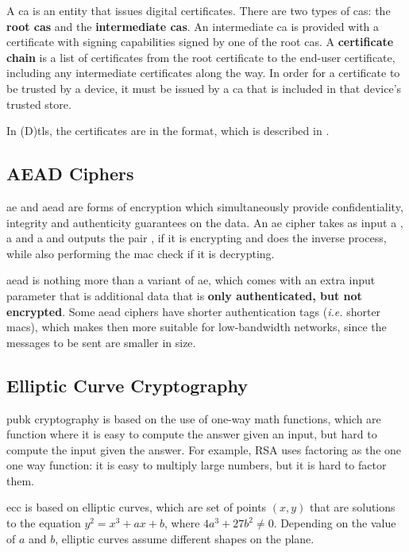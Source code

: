 \documentclass{llncs}
\begin{document}
A \gls{ca} is an entity that issues digital certificates. There are two types of
\gls{ca}s: the \textbf{root \gls{ca}s} and the \textbf{intermediate \gls{ca}s}.
An intermediate \gls{ca} is provided with a certificate with signing capabilities
signed by one of the root \gls{ca}s. A \textbf{certificate chain} is a list of
certificates from the root certificate to the end-user certificate, including
any intermediate certificates along the way. In order for a certificate
to be trusted by a device, it must be issued by a \gls{ca} that is included in that device's trusted store.

In (D)\gls{tls}, the certificates are in the  format, which is
described in \cite{rfc5280}.

\subsection{AEAD Ciphers}

\gls{ae} and \gls{aead} are forms of encryption which simultaneously provide
confidentiality, integrity and authenticity guarantees on the data. An \gls{ae}
cipher takes as input a , a  and a 
and outputs the pair , if it is encrypting and does the inverse
process, while also performing the \gls{mac} check if it is decrypting.

\gls{aead} is nothing more than a variant of \gls{ae}, which comes with an extra
input parameter that is additional data that is \textbf{only authenticated, but not encrypted}.
Some \gls{aead} ciphers have shorter authentication tags (\textit{i.e.} shorter \gls{mac}s),
which makes then more suitable for low-bandwidth networks, since the messages to be sent are smaller in size.

\subsection{Elliptic Curve Cryptography}

\gls{pubk} cryptography is based on the use of one-way math functions,
which are function where it is easy to compute the answer given an input,
but hard to compute the input given the answer. For example, RSA uses factoring
as the one one way function: it is easy to multiply large numbers, but it is hard
to factor them.

\gls{ecc} is based on elliptic curves, which are set of points $(x,y)$ that are
solutions to the equation $y^2 = x^3 + ax + b$, where $4a^3 + 27b^2 \neq 0$.
Depending on the value of $a$ and $b$, elliptic curves assume different shapes
on the plane.
\end{document}
